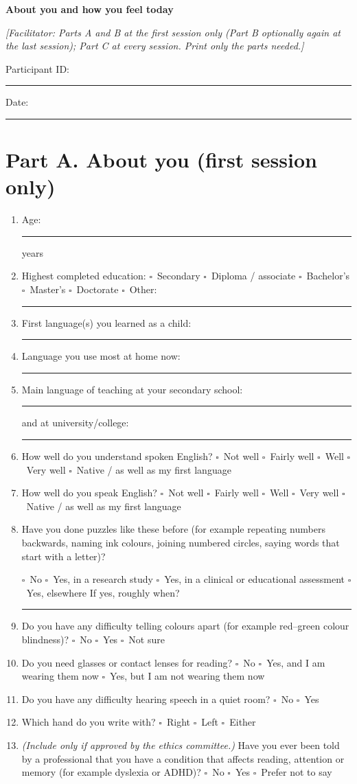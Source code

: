 \documentclass[10pt,a4paper]{article}
\newcommand{\blank}[1][1.2cm]{\rule{#1}{0.4pt}}
\newcommand{\bx}{$\square$}
\begin{document}
\begin{center}{\LARGE\bfseries About you and how you feel today}\end{center}
{\footnotesize\itshape [Facilitator: Parts A and B at the first session only (Part B optionally again at the last session); Part C at every session. Print only the parts needed.]}

Participant ID: \blank[4cm]\qquad Date: \blank[3cm]
\section*{Part A. About you (first session only)}
\begin{enumerate}[itemsep=5pt]
\item Age: \blank[1.5cm] years
\item Highest completed education: \bx\ Secondary \quad \bx\ Diploma / associate \quad \bx\ Bachelor's \quad \bx\ Master's \quad \bx\ Doctorate \quad \bx\ Other: \blank[2.5cm]
\item First language(s) you learned as a child: \blank[6cm]
\item Language you use most at home now: \blank[5cm]
\item Main language of teaching at your secondary school: \blank[4cm] \quad and at university/college: \blank[3.5cm]
\item How well do you understand spoken English? \bx\ Not well \quad \bx\ Fairly well \quad \bx\ Well \quad \bx\ Very well \quad \bx\ Native / as well as my first language
\item How well do you speak English? \bx\ Not well \quad \bx\ Fairly well \quad \bx\ Well \quad \bx\ Very well \quad \bx\ Native / as well as my first language
\item Have you done puzzles like these before (for example repeating numbers backwards, naming ink colours, joining numbered circles, saying words that start with a letter)?\par
\bx\ No \quad \bx\ Yes, in a research study \quad \bx\ Yes, in a clinical or educational assessment \quad \bx\ Yes, elsewhere \quad If yes, roughly when? \blank[2.5cm]
\item Do you have any difficulty telling colours apart (for example red--green colour blindness)? \bx\ No \quad \bx\ Yes \quad \bx\ Not sure
\item Do you need glasses or contact lenses for reading? \bx\ No \quad \bx\ Yes, and I am wearing them now \quad \bx\ Yes, but I am not wearing them now
\item Do you have any difficulty hearing speech in a quiet room? \bx\ No \quad \bx\ Yes
\item Which hand do you write with? \bx\ Right \quad \bx\ Left \quad \bx\ Either
\item \emph{(Include only if approved by the ethics committee.)} Have you ever been told by a professional that you have a condition that affects reading, attention or memory (for example dyslexia or ADHD)? \bx\ No \quad \bx\ Yes \quad \bx\ Prefer not to say
\end{enumerate}
\end{document}
